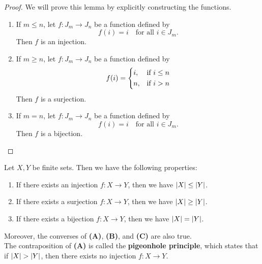 \begin{proof}
    We will prove this lemma by explicitly constructing the functions.
    \begin{enumerate}[label=\textbf{(\Alph*)}]
        \item If $m \leq n$, let $f: J_{m} \to J_{n}$ be a function defined by
        \[
        f(i) = i \quad \text{for all } i \in J_{m}.
        \]
        Then $f$ is an injection.
        \item If $m \geq n$, let $f: J_{m} \to J_{n}$ be a function defined by
        \[
        f(i) = \begin{dcases}
            i, & \text{if } i \leq n \\
            n, & \text{if } i > n
        \end{dcases}
        \]
        Then $f$ is a surjection.
        \item If $m = n$, let $f: J_{m} \to J_{n}$ be a function defined by
        \[
        f(i) = i \quad \text{for all } i \in J_{m}.
        \]
        Then $f$ is a bijection.
    \end{enumerate}
\end{proof}

\bigskip

\begin{theorem} \label{thm:PropertiesOfCardinality}
    Let $X, Y$ be finite sets. Then we have the following properties:
    \begin{enumerate}[label=\textbf{(\Alph*)}]
        \item If there exists an injection $f: X \to Y$, then we have $\abs*{X} \leq \abs*{Y}$.
        \item If there exists a surjection $f: X \to Y$, then we have $\abs*{X} \geq \abs*{Y}$.
        \item If there exists a bijection $f: X \to Y$, then we have $\abs*{X} = \abs*{Y}$.
    \end{enumerate}
    Moreover, the converses of \textbf{(A)}, \textbf{(B)}, and \textbf{(C)} are also true.
    \\[6mm]
    The contraposition of \textbf{(A)} is called the \textbf{pigeonhole principle}, which states that
    if $\abs*{X} > \abs*{Y}$, then there exists no injection $f: X \to Y$.
\end{theorem}

